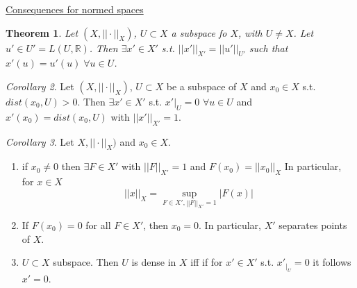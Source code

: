 \documentclass[a4paper, 12pt]{article}
\theoremstyle{plain}
\newtheorem{theorem}{Theorem}[subsection] %
\theoremstyle{definition}
\theoremstyle{lemma}
\theoremstyle{remark}
\theoremstyle{corollary}
\newtheorem{corollary}[theorem]{Corollary}
\theoremstyle{example}
\begin{document}
	\underline{Consequences for normed spaces}
	\begin{theorem}
		Let $(X,||\cdot ||_X)$, $U \subset X$ a subspace fo $X$, with $U \neq X$. Let $u' \in U' =  L(U,\mathbb{R})$. Then $\exists x' \in X'$ s.t. $||x'||_{X'} = ||u'||_{U'}$ such that $x'(u) = u'(u) \; \forall u \in U$.
	\end{theorem}
	\begin{corollary}
		Let $(X,||\cdot||_X)$, $U\subset X$ be a subspace of $X$ and $x_0 \in X$ s.t. $dist(x_0,U)>0$. Then $\exists x' \in X'$ s.t. $x'|_U = 0$ $\forall u \in U$ and $x'(x_0) = dist(x_0,U)$ with $||x'||_{X'} = 1$. 
	\end{corollary}
	\begin{corollary}
		Let $X,||\cdot||_X)$ and $x_0 \in X$. \begin{enumerate}
			\item if $x_0 \neq 0$ then $\exists F \in X'$ with $||F||_{X'}=1$ and $F(x_0) = ||x_0||_X$ In particular, for $x \in X$ \[||x||_X = \sup_{F\in X', ||F||_{X'}=1}\left|F(x)\right|\]
			\item If $F(x_0) = 0$ for all $F\in X'$, then $x_0 = 0$. In particular, $X'$ separates points of $X$.
			\item $U \subset X$ subspace. Then $U$ is dense in $X$ iff if for $x'\in X'$ s.t. $x'_{|_U} = 0$ it follows $x' = 0$.
		\end{enumerate}
	\end{corollary}
\end{document}
